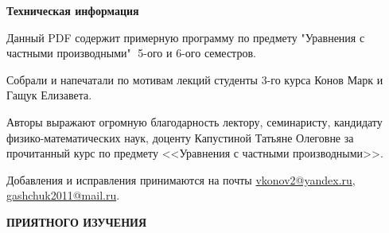 \begin{center}
	{\Large \textbf{Техническая информация}}
\end{center}

\vspace{0.5cm}
Данный PDF содержит примерную программу по предмету "Уравнения с частными производными"$\;$ 5-ого и 6-ого семестров.

\vspace{0.5cm}
Собрали и напечатали по мотивам лекций студенты 3-го курса Конов Марк и Гащук Елизавета.

\vspace{0.5cm}
Авторы выражают огромную благодарность лектору, семинаристу, кандидату физико-математических наук, доценту Капустиной Татьяне Олеговне за прочитанный курс по предмету <<Уравнения с частными производными>>.

\vspace{0.5cm}
Добавления и исправления принимаются на почты \href{}{vkonov2@yandex.ru}, \href{}{gashchuk2011@mail.ru}.

\vspace{0.5cm}
\begin{center}
	{\Large \textbf{ПРИЯТНОГО ИЗУЧЕНИЯ}}
\end{center}

\newpage

